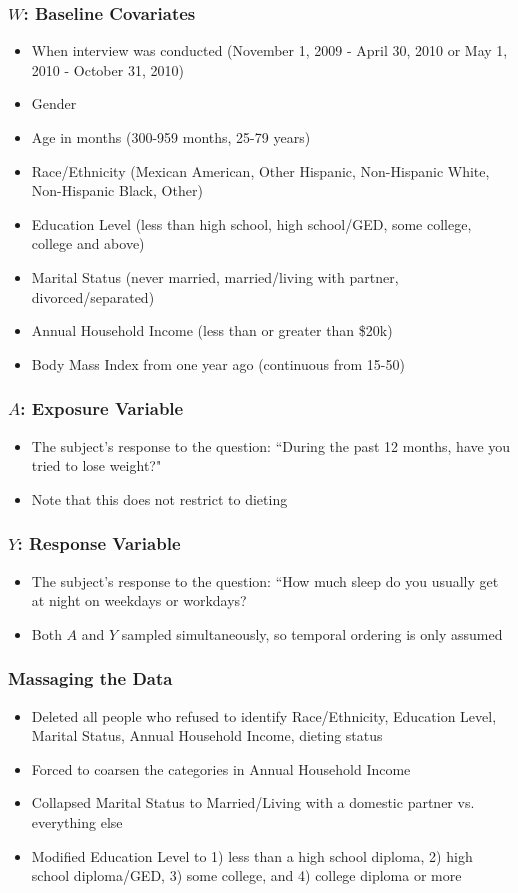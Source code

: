 \documentclass{beamer}
\begin{document}
\begin{frame}
\frametitle{$W$: Baseline Covariates}
   \begin{itemize}
   \item When interview was conducted (November 1, 2009 - April 30, 2010 or May 1, 2010 - October 31, 2010)
   \item Gender
   \item Age in months (300-959 months, 25-79 years)
   \item Race/Ethnicity (Mexican American, Other Hispanic, Non-Hispanic White, Non-Hispanic Black, Other)
   \item Education Level (less than high school, high school/GED, some college, college and above)
   \item Marital Status (never married, married/living with partner, divorced/separated)
   \item Annual Household Income (less than or greater than \$20k)
   \item Body Mass Index from one year ago (continuous from 15-50)
  \end{itemize}
\end{frame}

\begin{frame}
 \frametitle{$A$: Exposure Variable}
  \begin{itemize}
    \item The subject's response to the question: ``During the past 12 months, have you tried to lose weight?"
    \item Note that this does not restrict to dieting
  \end{itemize}
\end{frame}

\begin{frame}
 \frametitle{$Y$: Response Variable}
  \begin{itemize}
    \item The subject's response to the question: ``How much sleep do you usually get at night on weekdays or workdays?
    \item Both $A$ and $Y$ sampled simultaneously, so temporal ordering is only assumed
  \end{itemize}
\end{frame}

\begin{frame}
\frametitle{Massaging the Data}
  \begin{itemize}
    \vfill \item Deleted all people who refused to identify Race/Ethnicity, Education Level, Marital Status, Annual Household Income, dieting status
    \vfill \item Forced to coarsen the categories in Annual Household Income
    \vfill \item Collapsed Marital Status to Married/Living with a domestic partner vs. everything else
    \vfill \item Modified Education Level to 1) less than a high school diploma, 2) high school diploma/GED, 3) some college, and 4) college diploma or more
  \end{itemize}
\end{frame}
\end{document}
